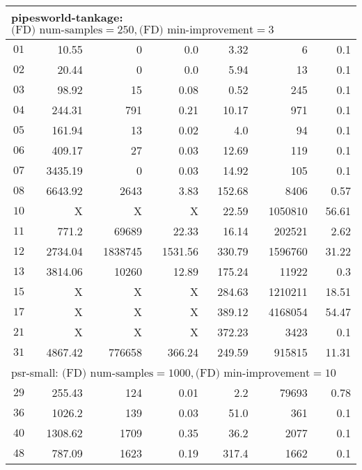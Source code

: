 \begin{longtable}{|c||r|r|r||r|r|r|}
\multicolumn{7}{|l|}{pipesworld-tankage: $\text{(FD) num-samples}=250,\text{(FD) min-improvement}=3$}\\\hline
$01$ & 10.55 & 0 & 0.0 & 3.32 & 6 & 0.1 \\\hline
$02$ & 20.44 & 0 & 0.0 & 5.94 & 13 & 0.1 \\\hline
$03$ & 98.92 & 15 & 0.08 & 0.52 & 245 & 0.1 \\\hline
$04$ & 244.31 & 791 & 0.21 & 10.17 & 971 & 0.1 \\\hline
$05$ & 161.94 & 13 & 0.02 & 4.0 & 94 & 0.1 \\\hline
$06$ & 409.17 & 27 & 0.03 & 12.69 & 119 & 0.1 \\\hline
$07$ & 3435.19 & 0 & 0.03 & 14.92 & 105 & 0.1 \\\hline
$08$ & 6643.92 & 2643 & 3.83 & 152.68 & 8406 & 0.57 \\\hline
$10$ &  X &  X &  X & 22.59 & 1050810 & 56.61 \\\hline
$11$ & 771.2 & 69689 & 22.33 & 16.14 & 202521 & 2.62 \\\hline
$12$ & 2734.04 & 1838745 & 1531.56 & 330.79 & 1596760 & 31.22 \\\hline
$13$ & 3814.06 & 10260 & 12.89 & 175.24 & 11922 & 0.3 \\\hline
$15$ &  X &  X &  X & 284.63 & 1210211 & 18.51 \\\hline
$17$ &  X &  X &  X & 389.12 & 4168054 & 54.47 \\\hline
$21$ &  X &  X &  X & 372.23 & 3423 & 0.1 \\\hline
$31$ & 4867.42 & 776658 & 366.24 & 249.59 & 915815 & 11.31 \\\hline

\multicolumn{7}{|l|}{psr-small: $\text{(FD) num-samples}=1000,\text{(FD) min-improvement}=10$}\\\hline
$29$ & 255.43 & 124 & 0.01 & 2.2 & 79693 & 0.78 \\\hline
$36$ & 1026.2 & 139 & 0.03 & 51.0 & 361 & 0.1 \\\hline
$40$ & 1308.62 & 1709 & 0.35 & 36.2 & 2077 & 0.1 \\\hline
$48$ & 787.09 & 1623 & 0.19 & 317.4 & 1662 & 0.1 \\\hline


\end{longtable}
